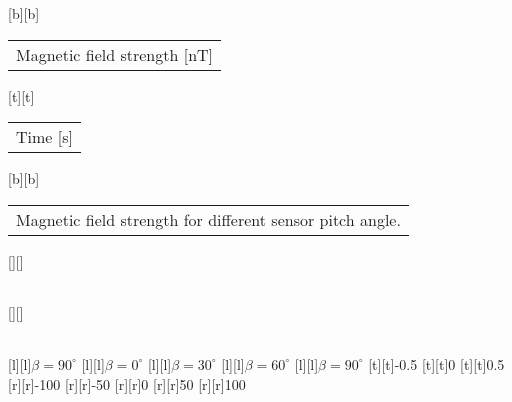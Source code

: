 %
[b][b]{\fontsize{8}{12}\selectfont \setlength{\tabcolsep}{0pt}\begin{tabular}{c}Magnetic field strength [nT]\end{tabular}}%
[t][t]{\fontsize{8}{12}\selectfont \setlength{\tabcolsep}{0pt}\begin{tabular}{c}Time [s]\end{tabular}}%
[b][b]{\fontsize{8}{12}\selectfont \setlength{\tabcolsep}{0pt}\begin{tabular}{c}Magnetic field strength for different sensor pitch angle.\end{tabular}}%
[][]{\fontsize{10}{15}\selectfont \setlength{\tabcolsep}{0pt}\begin{tabular}{c} \end{tabular}}%
[][]{\fontsize{10}{15}\selectfont \setlength{\tabcolsep}{0pt}\begin{tabular}{c} \end{tabular}}%
[l][l]{\fontsize{6}{15}\selectfont $\beta = 90^\circ$}%
[l][l]{\fontsize{6}{15}\selectfont $\beta = 0^\circ$}%
[l][l]{\fontsize{6}{15}\selectfont $\beta = 30^\circ$}%
[l][l]{\fontsize{6}{15}\selectfont $\beta = 60^\circ$}%
[l][l]{\fontsize{6}{15}\selectfont $\beta = 90^\circ$}%
%
\fontsize{6}{15}%
\selectfont%
%
[t][t]{-0.5}%
[t][t]{0}%
[t][t]{0.5}%
%
[r][r]{-100}%
[r][r]{-50}%
[r][r]{0}%
[r][r]{50}%
[r][r]{100}%
%
